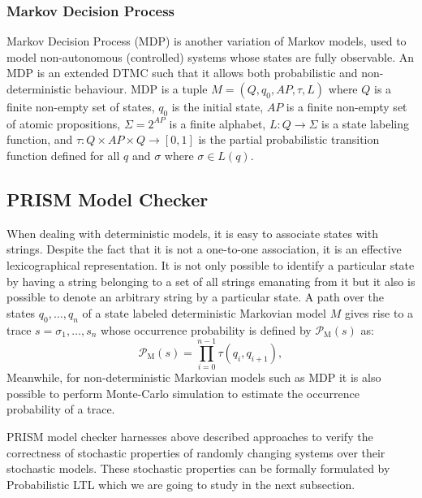 \documentclass[
a4paper,
12pt
]{scrartcl}
\newcommand\Prob[1]{ \operatorname {\mathcal{P}_{#1}}}
\begin{document}
\subsubsection{Markov Decision Process}
Markov Decision Process (MDP) is another variation of Markov models, used to model non-autonomous (controlled) systems whose states are fully observable. An MDP is an extended DTMC such that it allows both probabilistic and non-deterministic behaviour. MDP is a tuple $M=(Q, q_0, AP, \tau, L)$ where $Q$ is a finite non-empty set of states, $q_0$ is the initial state, $AP$ is a finite non-empty set of atomic propositions, $\Sigma = 2^{AP}$ is a finite alphabet, $L:Q \to \Sigma$ is a state labeling function, and $\tau: Q \times AP \times Q \to [0,1]$ is the partial probabilistic transition function defined for all $q$ and $\sigma$ where $\sigma \in L(q)$.
\subsection{PRISM Model Checker}
When dealing with deterministic models, it is easy to associate states with strings. Despite the fact that it is not a one-to-one association, it is an effective lexicographical representation. It is not only possible to identify a particular state by having a string belonging to a set of all strings emanating from it but it also is possible to denote an arbitrary string by a particular state.
A path over the states $q_0, \dots, q_n$ of a state labeled deterministic Markovian model $M$ gives rise to a trace $s = \sigma_1, \dots, s_n$ whose occurrence probability is defined by $\Prob{M}(s)$ as:
\begin{equation*}
  \Prob{M}(s) = \prod_{i=0}^{n-1}\tau(q_i,q_{i+1}),
\end{equation*}
Meanwhile, for non-deterministic Markovian models such as MDP it is also possible to perform Monte-Carlo simulation to estimate the occurrence probability of a trace.
\par PRISM model checker harnesses above described approaches to verify the correctness of stochastic properties of randomly changing systems over their stochastic models. These stochastic properties can be formally formulated by Probabilistic LTL which we are going to study in the next subsection.
\end{document}
